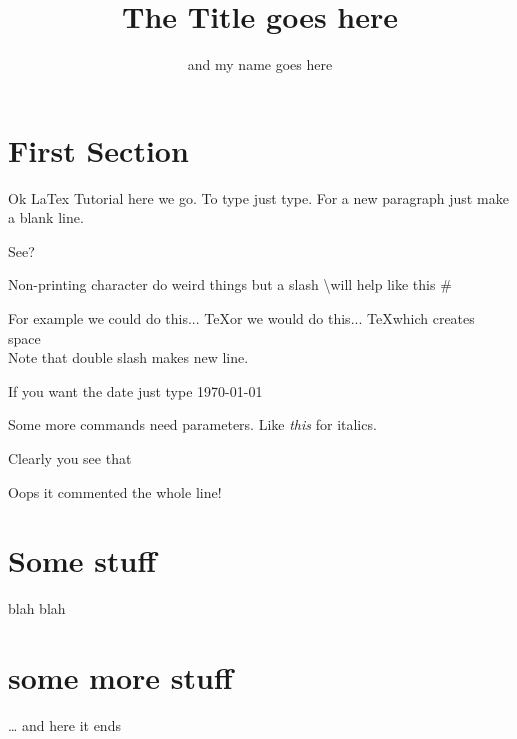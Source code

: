 \documentclass[11pt,letterpaper]{amsart}  %
\title{The Title goes here}
\author{and my name goes here}
\begin{document}
\thispagestyle{plain} %

\maketitle  %

\tableofcontents

\section{First Section}

Ok LaTex Tutorial here we go. To type just type. For a new paragraph just make a blank line.

See?

Non-printing character do weird things but a slash \textbackslash will help like this \#

For example we could do this... \TeX or we would do this... \TeX{}which creates space \\ Note that double slash makes new line.

If you want the date just type \today

Some more commands need parameters. Like \textsl{this}  for italics.

Clearly you see that %

Oops it commented the whole line!

\section{Some stuff}
blah blah
\section{some more stuff}
\ldots{} and here it ends
\end{document}
